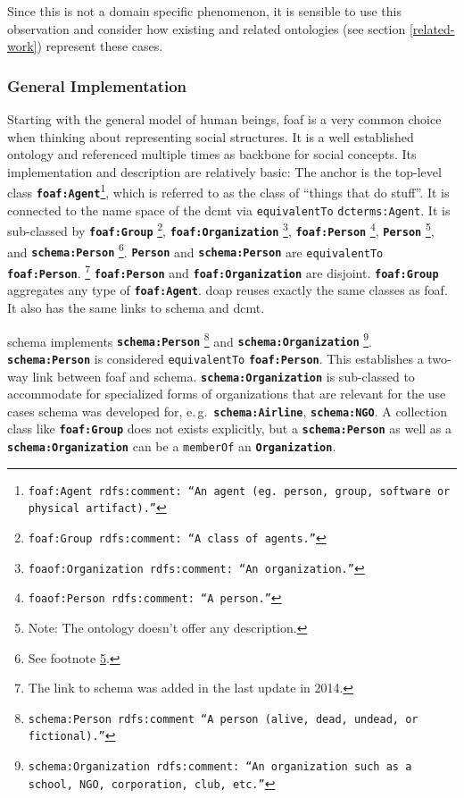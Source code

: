 \documentclass[a4paper, DIV=13, BCOR=0cm]{scrbook}
\newcommand{\eg}{e.\,g.\ }
\newcommand{\class}[1]{\texttt{\textbf{#1}}}
\newcommand{\relation}[1]{\texttt{#1}}
\newcommand{\foottt}[1]{\footnote{\texttt{#1}}}
\begin{document}
Since this is not a domain specific phenomenon, it is sensible to use this observation and consider how existing and related ontologies (see section \ref{related-work}) represent these cases.

\subsubsection{General Implementation }
\label{human-beings-in-other-ontologies}
Starting with the general model of human beings, \gls{foaf} is a very common choice when thinking about representing social structures. It is a well established ontology and referenced multiple times as backbone for social concepts. Its implementation and description are relatively basic: The anchor is the top-level class \class{foaf:Agent}\foottt{foaf:Agent rdfs:comment: \enquote{An agent (eg. person, group, software or physical artifact).}}, which is referred to as the class of \enquote{things that do stuff}. It is connected to the name space of the \gls{dcmt} via \relation{equivalentTo} \relation{dcterms:Agent}. It is sub-classed by
%
\class{foaf:Group}%
	\foottt{foaf:Group rdfs:comment: \enquote{A class of agents.}},
%
\class{foaf:Organization}%
	\foottt{foaof:Organization rdfs:comment: \enquote{An organization.}},
%
\class{foaf:Person}%
	\foottt{foaof:Person rdfs:comment: \enquote{A person.}},
%
\class{Person}%
	\footnote{\label{footn:no-desc}Note: The ontology doesn't offer any description.}, and
\class{schema:Person}%
	\footnote{See footnote \ref{footn:no-desc}.}.
\class{Person} and \class{schema:Person} are \relation{equivalentTo} \class{foaf:Person}.%
	\footnote{The link to \gls{schema} was added in the last update in 2014.} \class{foaf:Person} and \class{foaf:Organization} are disjoint. \class{foaf:Group} aggregates any type of \class{foaf:Agent}. \gls{doap} reuses exactly the same classes as \gls{foaf}. It also has the same links to \gls{schema} and \gls{dcmt}.

\gls{schema} implements
\class{schema:Person}%
	\foottt{schema:Person rdfs:comment \enquote{A person (alive, dead, undead, or fictional).}} and
%
\class{schema:Organization}%
	\foottt{schema:Organization rdfs:comment: \enquote{An organization such as a school, NGO, corporation, club, etc.}}.
%
\class{schema:Person} is considered \relation{equivalentTo} \class{foaf:Person}. This establishes a two-way link between \gls{foaf} and \gls{schema}. \class{schema:Organization} is sub-classed to accommodate for specialized forms of organizations that are relevant for the use cases schema was developed for, \eg \class{schema:Airline}, \class{schema:NGO}. A collection class like \class{foaf:Group} does not exists explicitly, but a \class{schema:Person} as well as a \class{schema:Organization} can be a \relation{memberOf} an \class{Organization}.
\end{document}
